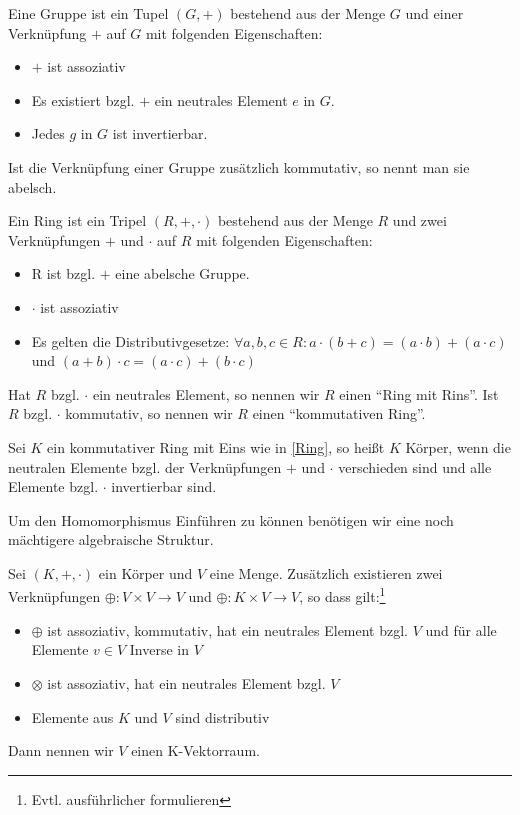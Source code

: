 \begin{theorem}[Gruppe]
	Eine Gruppe ist ein Tupel $(G,+)$ bestehend aus der Menge $G$ und einer Verknüpfung $+$ auf $G$ mit folgenden Eigenschaften:
	\begin{itemize}
		\item $+$ ist assoziativ
		\item Es existiert bzgl. $+$ ein neutrales Element $e$ in $G$.
		\item Jedes $g$ in $G$ ist invertierbar.
	\end{itemize}
	
	Ist die Verknüpfung einer Gruppe zusätzlich kommutativ, so nennt man sie abelsch.
	
\end{theorem}

\begin{theorem}[Ring]
	\label{Ring}
	Ein Ring ist ein Tripel $(R,+,\cdot)$ bestehend aus der Menge $R$ und zwei Verknüpfungen $+$ und $\cdot$ auf $R$ mit folgenden Eigenschaften:
	\begin{itemize}
		\item R ist bzgl. $+$ eine abelsche Gruppe.
		\item $\cdot$ ist assoziativ
		\item Es gelten die Distributivgesetze: $\forall a,b,c\in R: a\cdot(b+c)=(a\cdot b)+(a\cdot c)$ und $(a+b)\cdot c = (a\cdot c)+(b\cdot c)$
	\end{itemize}
\end{theorem}

Hat $R$ bzgl. $\cdot$ ein neutrales Element, so nennen wir $R$ einen \enquote{Ring mit Rins}. Ist $R$ bzgl. $\cdot$ kommutativ, so nennen wir $R$ einen \enquote{kommutativen Ring}. 

\begin{theorem}[Körper]
	Sei $K$ ein kommutativer Ring mit Eins wie in \ref{Ring}, so heißt $K$ Körper, wenn die neutralen Elemente bzgl. der Verknüpfungen $+$ und $\cdot$ verschieden sind und alle Elemente bzgl. $\cdot$ invertierbar sind.
	
\end{theorem}

Um den Homomorphismus Einführen zu können benötigen wir eine noch mächtigere algebraische Struktur.

\begin{theorem}[K-Vektorraum]
	Sei $(K,+,\cdot)$ ein Körper und $V$ eine Menge. Zusätzlich existieren zwei Verknüpfungen $\oplus: V\times V \rightarrow V$ und $\oplus: K\times V \rightarrow V$, so dass gilt:\footnote{Evtl. ausführlicher formulieren}
	\begin{itemize}
		\item $\oplus$ ist assoziativ, kommutativ, hat ein neutrales Element bzgl. $V$ und für alle Elemente $v\in V$ Inverse in $V$
		\item $\otimes$ ist assoziativ, hat ein neutrales Element bzgl. $V$
		\item Elemente aus $K$ und $V$ sind distributiv
	\end{itemize}
	Dann nennen wir $V$ einen K-Vektorraum.
\end{theorem}

